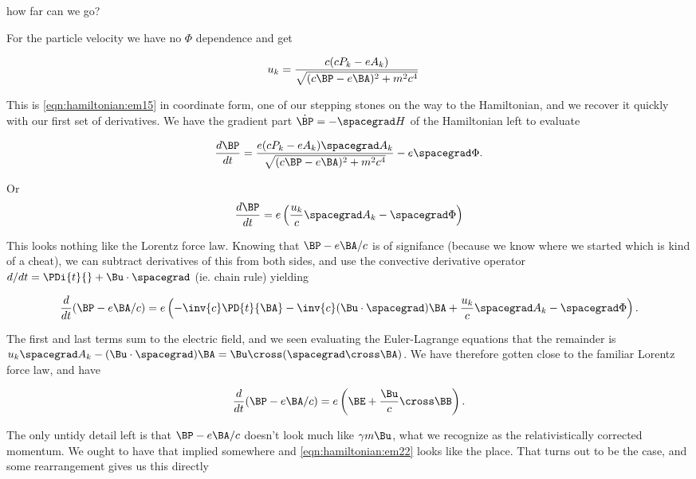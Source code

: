 how far can we go?

For the particle velocity we have no $\Phi$ dependence and get

\begin{align}\label{eqn:hamiltonian:em22}
u_k &= \frac{c (c P_k -e A_k)}{\sqrt{ (c \BP - e \BA)^2 + m^2 c^4 }}
\end{align}

This is \ref{eqn:hamiltonian:em15} in coordinate form, one of our stepping stones on the way to the Hamiltonian, and we recover it quickly with our first set of derivatives.  We have the gradient part $\dot{\BP} = -\spacegrad H$ of the Hamiltonian left to evaluate 

\begin{align}\label{eqn:hamiltonian:em23}
\frac{d\BP}{dt} = 
\frac{e (c P_k -e A_k) \spacegrad A_k }{\sqrt{ (c \BP - e \BA)^2 + m^2 c^4 }} - e \spacegrad \Phi.
\end{align}

Or
\begin{align}\label{eqn:hamiltonian:em23b}
\frac{d\BP}{dt} = e \left( \frac{u_k}{c} \spacegrad A_k - \spacegrad \Phi \right)
\end{align}

This looks nothing like the Lorentz force law.  Knowing that $\BP - e\BA/c$ is of signifance (because we know where we started which is kind of a cheat), we can subtract derivatives of this from both sides, and use the convective derivative operator $d/dt = \PDi{t}{} + \Bu \cdot \spacegrad$ (ie. chain rule) yielding

\begin{align}\label{eqn:hamiltonian:em23c}
\frac{d}{dt}(\BP - e\BA/c) = e \left( -\inv{c}\PD{t}{\BA} - \inv{c} (\Bu \cdot \spacegrad) \BA + \frac{u_k}{c} \spacegrad A_k - \spacegrad \Phi \right).
\end{align}

The first and last terms sum to the electric field, and we seen evaluating the Euler-Lagrange equations that the remainder is $u_k \spacegrad A_k - (\Bu \cdot \spacegrad) \BA = \Bu \cross (\spacegrad \cross \BA)$.  We have therefore gotten close to the familiar Lorentz force law, and have

\begin{align}\label{eqn:hamiltonian:em24}
\frac{d}{dt}(\BP - e\BA/c) = e \left( \BE + \frac{\Bu}{c} \cross \BB \right).
\end{align}

The only untidy detail left is that $\BP - e \BA/c$ doesn't look much like $\gamma m \Bu$, what we recognize as the relativistically corrected momentum.  We ought to have that implied somewhere and \ref{eqn:hamiltonian:em22} looks like the place.  That turns out to be the case, and some rearrangement gives us this directly

